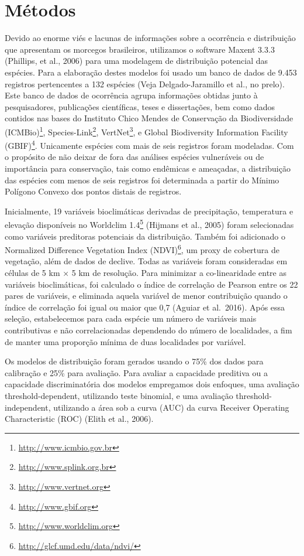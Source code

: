 \documentclass[
  oneside]{scrbook}
\DeclareRobustCommand{\href}[2]{#2\footnote{\url{#1}}}
\begin{document}
\hypertarget{metodos-morcegos}{%
\section{Métodos}\label{metodos-morcegos}}

Devido ao enorme viés e lacunas de informações sobre a ocorrência e distribuição que apresentam os morcegos brasileiros, utilizamos o software Maxent 3.3.3 (Phillips, et al., 2006) para uma modelagem de distribuição potencial das espécies. Para a elaboração destes modelos foi usado um banco de dados de 9.453 registros pertencentes a 132 espécies (Veja Delgado-Jaramillo et al., no prelo). Este banco de dados de ocorrência agrupa informações obtidas junto à pesquisadores, publicações científicas, teses e dissertações, bem como dados contidos nas bases do \href{http://www.icmbio.gov.br}{Instituto Chico Mendes de Conservação da Biodiversidade (ICMBio)}, \href{http://www.splink.org.br}{Species-Link}, \href{http://www.vertnet.org}{VertNet}, e \href{http://www.gbif.org}{Global Biodiversity Information Facility (GBIF)}. Unicamente espécies com mais de seis registros foram modeladas. Com o propósito de não deixar de fora das análises espécies vulneráveis ou de importância para conservação, tais como endêmicas e ameaçadas, a distribuição das espécies com menos de seis registros foi determinada a partir do Mínimo Polígono Convexo dos pontos distais de registros.

Inicialmente, 19 variáveis bioclimáticas derivadas de precipitação, temperatura e elevação disponíveis no \href{http://www.worldclim.org}{Worldclim 1.4} (Hijmans et al., 2005) foram selecionadas como variáveis preditoras potenciais da distribuição. Também foi adicionado o \href{http://glcf.umd.edu/data/ndvi/}{Normalized Difference Vegetation Index (NDVI)}, um proxy de cobertura de vegetação, além de dados de declive. Todas as variáveis foram consideradas em células de 5 km × 5 km de resolução. Para minimizar a co-linearidade entre as variáveis bioclimáticas, foi calculado o índice de correlação de Pearson entre os 22 pares de variáveis, e eliminada aquela variável de menor contribuição quando o índice de correlação foi igual ou maior que 0,7 (Aguiar et al.~2016). Após essa seleção, estabelecemos para cada espécie um número de variáveis mais contributivas e não correlacionadas dependendo do número de localidades, a fim de manter uma proporção mínima de duas localidades por variável.

Os modelos de distribuição foram gerados usando o 75\% dos dados para calibração e 25\% para avaliação. Para avaliar a capacidade preditiva ou a capacidade discriminatória dos modelos empregamos dois enfoques, uma avaliação threshold-dependent, utilizando teste binomial, e uma avaliação threshold-independent, utilizando a área sob a curva (AUC) da curva Receiver Operating Characteristic (ROC) (Elith et al., 2006).
\end{document}
